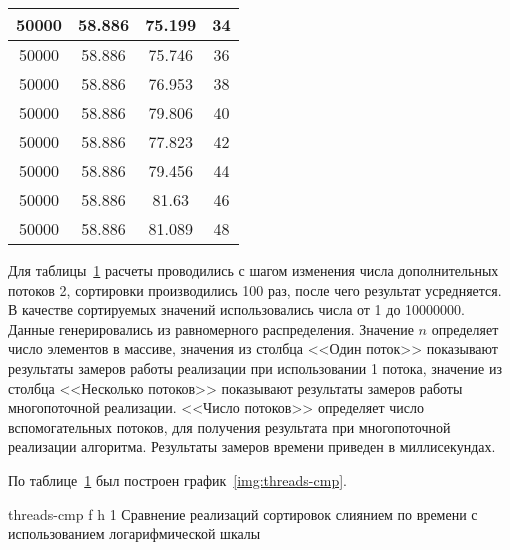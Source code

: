 \begin{table}[ht]
\begin{tabular}{|c|c|c|c|}
	50000 & 58.886                  & 75.199                            & 34          \\ \hline
	50000 & 58.886                  & 75.746                            & 36          \\ \hline
	50000 & 58.886                  & 76.953                            & 38          \\ \hline
	50000 & 58.886                  & 79.806                            & 40          \\ \hline
	50000 & 58.886                  & 77.823                            & 42          \\ \hline
	50000 & 58.886                  & 79.456                            & 44          \\ \hline
	50000 & 58.886                  & 81.63                             & 46          \\ \hline
	50000 & 58.886                  & 81.089                            & 48          \\ \hline
	\end{tabular}
	\label{t:timings}
\end{table}
Для таблицы~\ref{t:timings} расчеты проводились с шагом изменения числа дополнительных потоков 2, сортировки производились 100 раз, после чего результат усредняется. В качестве сортируемых значений использовались  числа от 1 до 10000000. Данные генерировались из равномерного распределения.
Значение $n$ определяет число элементов в массиве, значения из столбца <<Один поток>> показывают результаты замеров  работы реализации при использовании 1 потока, значение  из столбца <<Несколько потоков>> показывают результаты замеров работы многопоточной реализации. <<Число потоков>> определяет число вспомогательных потоков, для получения результата при многопоточной реализации алгоритма. Результаты замеров времени приведен в миллисекундах.


По таблице~\ref{t:timings} был построен график~\ref{img:threads-cmp}. 

{threads-cmp} %
{f} %
{h} %
{1\textwidth} %
{Сравнение реализаций сортировок слиянием по времени с использованием логарифмической шкалы} %










